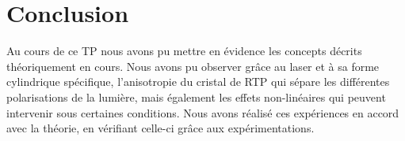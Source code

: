 \documentclass[a4paper,11pt]{report}
\begin{document}
\chapter*{Conclusion} 
Au cours de ce TP nous avons pu mettre en évidence les concepts décrits théoriquement en cours. Nous avons pu observer grâce au laser et à sa forme cylindrique spécifique, l'anisotropie du cristal de RTP qui sépare les différentes polarisations de la lumière, mais également les effets non-linéaires qui peuvent intervenir sous certaines conditions. Nous avons réalisé ces expériences en accord avec la théorie, en vérifiant celle-ci grâce aux expérimentations.
\end{document}
